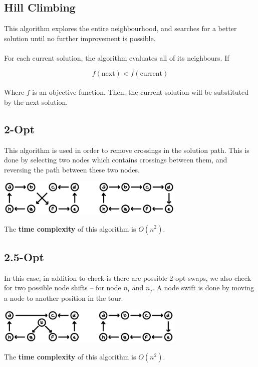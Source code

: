 \documentclass{article}
\begin{document}
\subsection{Hill Climbing}
This algorithm explores the entire neighbourhood, and searches for a better solution until no further improvement is possible. \\ \\
For each current solution, the algorithm evaluates all of its neighbours. If

\[ f(\text{next}) < f(\text{current}) \] \\
Where $f$ is an objective function. Then, the current solution will be substituted by the next solution.

\subsection{2-Opt}
This algorithm is used in order to remove crossings in the solution path. This is done by selecting two nodes which contains crossings between them, and reversing the path between these two nodes. \\

\begin{center}
	\includegraphics[width=9cm]{2opt.png}
\end{center}
\vspace{.3cm}
The \textbf{time complexity} of this algorithm is $O(n^2)$.

\subsection{2.5-Opt}
In this case, in addition to check is there are possible 2-opt swaps, we also check for two possible node shifts -- for node $n_i$ and $n_j$. A node swift is done by moving a node to another position in the tour. \\

\begin{center}
	\includegraphics[width=9cm]{2.5opt.png}
\end{center}
\vspace{.3cm}
The \textbf{time complexity} of this algorithm is $O(n^2)$.
\end{document}
